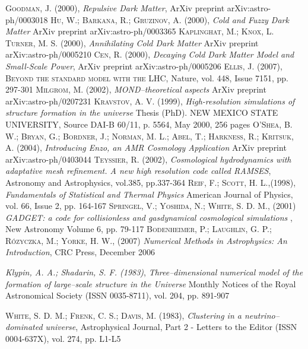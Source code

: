 \documentclass[a4paper,openright,12pt]{book}
\begin{document}
\begin{thebibliography}{a}
 \textsc{Goodman, J. (2000)},
\textit{Repulsive Dark Matter},
ArXiv preprint arXiv:astro-ph/0003018
 \textsc{Hu, W.; Barkana, R.; Gruzinov, A. (2000)},
\textit{Cold and Fuzzy Dark Matter}
ArXiv preprint arXiv:astro-ph/0003365
 \textsc{Kaplinghat, M.; Knox, L. Turner, M. S. (2000)},
\textit{Annihilating Cold Dark Matter}
ArXiv preprint arXiv:astro-ph/0005210
 \textsc{Cen, R. (2000)},
\textit{Decaying Cold Dark Matter Model and Small-Scale Power},
ArXiv preprint arXiv:astro-ph/0005206
 \textsc{Ellis, J. (2007)},
\textsc{Beyond the standard model with the LHC},
Nature, vol. 448, Issue 7151, pp. 297-301
 \textsc{Milgrom, M. (2002)},
\textit{MOND--theoretical aspects}
ArXiv preprint arXiv:astro-ph/0207231
 \textsc{Kravstov, A. V. (1999)},
\textit{High-resolution simulations of structure formation in the universe}
Thesis (PhD). NEW MEXICO STATE UNIVERSITY, Source DAI-B 60/11, p. 5564, May 2000, 256 pages
 \textsc{O'Shea, B. W.; Bryan, G.; Bordner, J.; Norman, M. L.; Abel, T.; Harkness, R.; Kritsuk, A. (2004)},
\textit{Introducing Enzo, an AMR Cosmology Application}
ArXiv preprint arXiv:astro-ph/0403044
 \textsc{Teyssier, R. (2002)},
\textit{Cosmological hydrodynamics with adaptative mesh refinement. A new high resolution code called RAMSES},
Astronomy and Astrophysics, vol.385, pp.337-364
 \textsc{Reif, F.; Scott, H. L.,(1998)},
\textit{Fundamentals of Statistical and Thermal Physics}
American Journal of Physics, vol. 66, Issue 2, pp. 164-167
 \textsc{Springel, V.; Yoshida, N.; White, S. D. M., (2001)}
\textit{GADGET: a code for collisionless and gasdynamical cosmological simulations },
New Astronomy Volume 6, pp. 79-117
 \textsc{Bodenheimer, P.; Laughlin, G. P.; Rózyczka, M.; Yorke, H. W., (2007)} 
\textit{Numerical Methods in Astrophysics: An Introduction},
CRC Press, December 2006

 \textit{Klypin, A. A.; Shadarin, S. F. (1983)},
\textit{Three--dimensional numerical model of the formation of large--scale structure in the Universe}
Monthly Notices of the Royal Astronomical Society (ISSN 0035-8711), vol. 204, pp. 891-907

 \textsc{White, S. D. M.; Frenk, C. S.; Davis, M. (1983)},
\textit{Clustering in a neutrino--dominated universe},
Astrophysical Journal, Part 2 - Letters to the Editor (ISSN 0004-637X), vol. 274, pp. L1-L5


\end{thebibliography}
\end{document}
